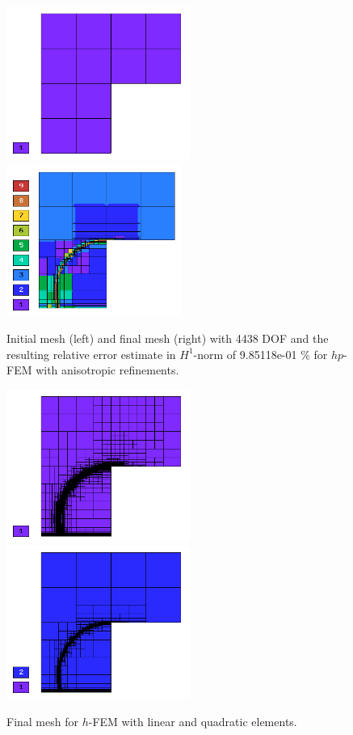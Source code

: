 \documentclass[12pt]{elsarticle}
\begin{document}
\begin{figure}[!ht]
\centering
\includegraphics[height=5cm]{nist/nist-12/mesh_hp_aniso_init.png}\ \
\includegraphics[height=5cm]{nist/nist-12/mesh_hp_aniso.png}
\caption{Initial mesh (left) and final mesh (right) with 4438 DOF and the resulting relative error estimate in $H^1$-norm of 9.85118e-01 \% for $hp$-FEM with anisotropic refinements.}
\label{fig:nist-12-hp-aniso}
\end{figure}

\begin{figure}[!ht]
\centering
\includegraphics[height=5cm]{nist/nist-12/mesh_h1_aniso.png}\ \
\includegraphics[height=5cm]{nist/nist-12/mesh_h2_aniso.png}
\caption{Final mesh for $h$-FEM with linear and quadratic elements.}
\label{fig:nist-12-h-aniso}
\end{figure}
\end{document}
